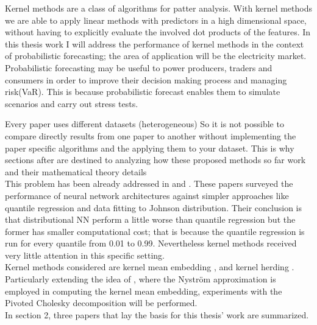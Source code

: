 


Kernel methods are a class of algorithms for patter analysis.
With kernel methods we are able to apply linear methods with predictors in a high dimensional space, without having to explicitly evaluate the involved dot products of the features.
In this thesis work I will address the performance of kernel methods in the context of probabilistic forecasting; the area of application will be the electricity market. 
Probabilistic forecasting may be useful to power producers, traders and consumers in order to improve their decision making process and managing risk(VaR). This is because probabilistic forecast enables them to simulate scenarios and carry out stress tests.


Every paper uses different datasets (heterogeneous)
So it is not possible to compare directly results
from one paper to another without implementing the
paper specific algorithms and the applying them to
your dataset.
This is why sections after are destined to analyzing
how these proposed methods so far work and their mathematical
theory details
\\
This problem has been already addressed in \cite{probablistic_electricity_forecast} and \cite{probablistic_electricity_forecast2}. 
These papers surveyed the performance of neural network architectures against simpler approaches like quantile regression and data fitting to Johnson distribution. Their conclusion is that distributional NN perform a little worse than quantile regression but the former has smaller computational cost; that is because the quantile regression is run for every quantile from 0.01 to 0.99.
Nevertheless kernel methods received very little attention in this specific setting.
\\
Kernel methods considered are kernel mean embedding \cite{pmlr}, \cite{Muandet_2017} and kernel herding \cite{supersamples}. Particularly extending the idea of \cite{2022nystrom}, where the Nyström approximation is employed in computing the kernel mean embedding, experiments with the Pivoted Cholesky decomposition will be performed.
\\
In section 2, three papers that lay the basis for this thesis’ work are summarized.
\\
